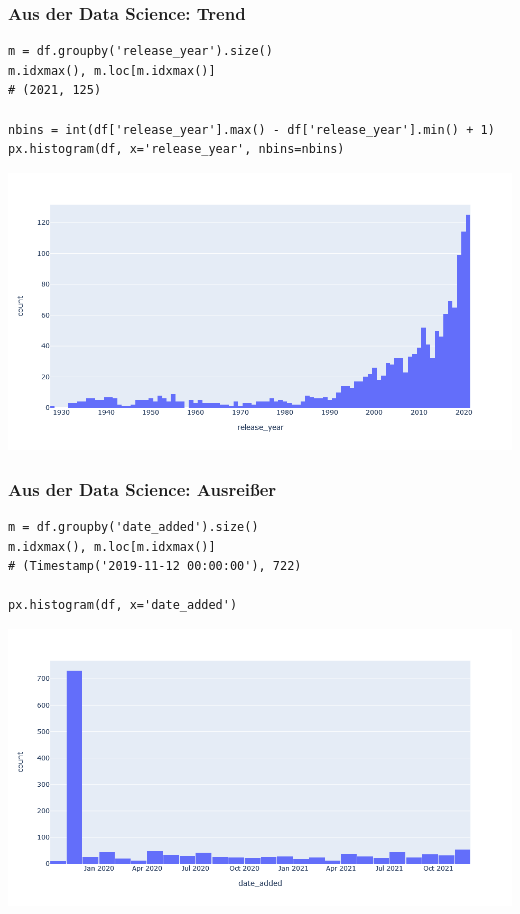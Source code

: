\begin{frame}[fragile]
\frametitle{Aus der Data Science: Trend}

\begin{verbatim}
m = df.groupby('release_year').size()
m.idxmax(), m.loc[m.idxmax()]
# (2021, 125)

nbins = int(df['release_year'].max() - df['release_year'].min() + 1)
px.histogram(df, x='release_year', nbins=nbins)
\end{verbatim}

\begin{center}
	\vspace{-\baselineskip}
	\includegraphics[height=0.5\textheight]{fig5/histogram1.png}
\end{center}
\end{frame}


\begin{frame}[fragile]
\frametitle{Aus der Data Science: Ausreißer}

\begin{verbatim}
m = df.groupby('date_added').size()
m.idxmax(), m.loc[m.idxmax()]
# (Timestamp('2019-11-12 00:00:00'), 722)

px.histogram(df, x='date_added')
\end{verbatim}

\begin{center}
	\vspace{-\baselineskip}
	\includegraphics[height=0.5\textheight]{fig5/histogram2.png}
\end{center}
\end{frame}


